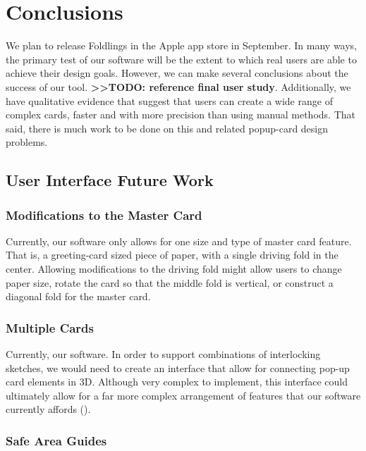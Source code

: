 \chapter{Conclusions}

We plan to release Foldlings in the Apple app store in September. In
many ways, the primary test of our software will be the extent to which
real users are able to achieve their design goals. However, we can make
several conclusions about the success of our tool.
\textbf{\textgreater{}\textgreater{}TODO: reference final user study}.
Additionally, we have qualitative evidence that suggest that users can
create a wide range of complex cards, faster and with more precision
than using manual methods. That said, there is much work to be done on
this and related popup-card design problems.

\section{User Interface Future Work}\label{user-interface-future-work}

\subsection{Modifications to the Master
Card}\label{modifications-to-the-master-card}

Currently, our software only allows for one size and type of master card
feature. That is, a greeting-card sized piece of paper, with a single
driving fold in the center. Allowing modifications to the driving fold
might allow users to change paper size, rotate the card so that the
middle fold is vertical, or construct a diagonal fold for the master
card.

\subsection{Multiple Cards}\label{multiple-cards}

Currently, our software. In order to support combinations of
interlocking sketches, we would need to create an interface that allow
for connecting pop-up card elements in 3D. Although very complex to
implement, this interface could ultimately allow for a far more complex
arrangement of features that our software currently affords
(\citet{hart2007modular}).

\subsection{Safe Area Guides}\label{safe-area-guides}

